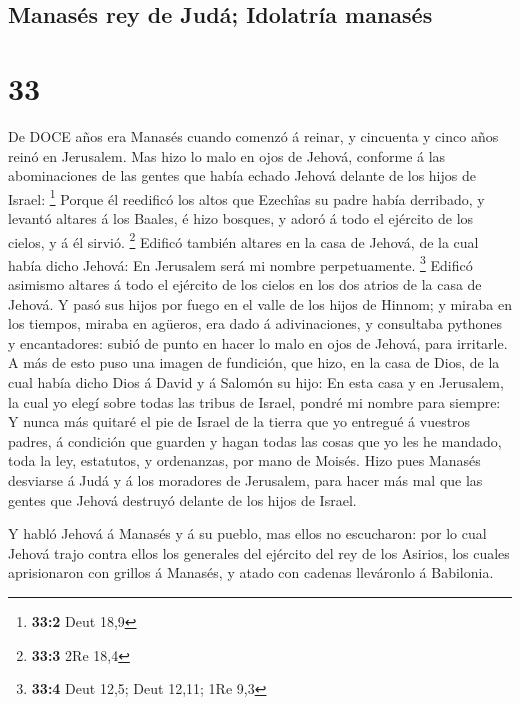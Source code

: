 \hypertarget{manasuxe9s-rey-de-juduxe1-idolatruxeda-manasuxe9s}{%
\subsection{Manasés rey de Judá; Idolatría
manasés}\label{manasuxe9s-rey-de-juduxe1-idolatruxeda-manasuxe9s}}

\hypertarget{section-32}{%
\section{33}\label{section-32}}

 De DOCE años era Manasés cuando comenzó á reinar, y
cincuenta y cinco años reinó en Jerusalem.  Mas hizo lo malo
en ojos de Jehová, conforme á las abominaciones de las gentes que había
echado Jehová delante de los hijos de Israel: \footnote{\textbf{33:2}
  Deut 18,9}  Porque él reedificó los altos que Ezechîas su
padre había derribado, y levantó altares á los Baales, é hizo bosques, y
adoró á todo el ejército de los cielos, y á él sirvió. \footnote{\textbf{33:3}
  2Re 18,4}  Edificó también altares en la casa de Jehová,
de la cual había dicho Jehová: En Jerusalem será mi nombre
perpetuamente. \footnote{\textbf{33:4} Deut 12,5; Deut 12,11; 1Re 9,3}
 Edificó asimismo altares á todo el ejército de los cielos
en los dos atrios de la casa de Jehová.  Y pasó sus hijos
por fuego en el valle de los hijos de Hinnom; y miraba en los tiempos,
miraba en agüeros, era dado á adivinaciones, y consultaba pythones y
encantadores: subió de punto en hacer lo malo en ojos de Jehová, para
irritarle.  A más de esto puso una imagen de fundición, que
hizo, en la casa de Dios, de la cual había dicho Dios á David y á
Salomón su hijo: En esta casa y en Jerusalem, la cual yo elegí sobre
todas las tribus de Israel, pondré mi nombre para siempre: 
Y nunca más quitaré el pie de Israel de la tierra que yo entregué á
vuestros padres, á condición que guarden y hagan todas las cosas que yo
les he mandado, toda la ley, estatutos, y ordenanzas, por mano de
Moisés.  Hizo pues Manasés desviarse á Judá y á los
moradores de Jerusalem, para hacer más mal que las gentes que Jehová
destruyó delante de los hijos de Israel.

 Y habló Jehová á Manasés y á su pueblo, mas ellos no
escucharon: por lo cual Jehová trajo contra ellos los generales del
ejército del rey de los Asirios, los cuales aprisionaron con grillos á
Manasés, y atado con cadenas lleváronlo á Babilonia.

